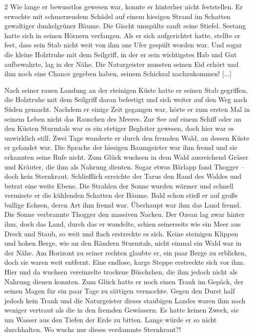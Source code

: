 \documentclass[10pt, a4paper, oneside]{book}
\begin{document}
\begin{multicols}{2}
Wie lange er bewusstlos gewesen war, konnte er hinterher nicht feststellen. Er erwachte mit schmerzendem Schädel auf einem kiesigen Strand im Schatten gewaltiger dunkelgrüner Bäume. Die Gischt umspülte sanft seine Stiefel. Seetang hatte sich in seinen Hörnern verfangen. Als er sich aufgerichtet hatte, stellte er fest, dass sein Stab nicht weit von ihm ans Ufer gespült worden war. Und sogar die kleine Holztruhe mit dem Seilgriff, in der er sein wichtigstes Hab und Gut aufbewahrte, lag in der Nähe. Die Naturgeister mussten seinen Eid erhört und ihm noch eine Chance gegeben haben, seinem Schicksal nachzukommen! [...]

Nach seiner rauen Landung an der steinigen Küste hatte er seinen Stab gegriffen, die Holztruhe mit dem Seilgriff daran befestigt und sich weiter auf den Weg nach Süden gemacht. Nachdem er einige Zeit gegangen war, hörte er zum ersten Mal in seinem Leben nicht das Rauschen des Meeres. Zur See auf einem Schiff oder an den Küsten Sturmtals war es ein stetiger Begleiter gewesen, doch hier war es unwirklich still. Zwei Tage wanderte er durch den fremden Wald, an dessen Küste er gelandet war. Die Sprache der hiesigen Baumgeister war ihm fremd und sie erkannten seine Rufe nicht. Zum Glück wuchsen in dem Wald ausreichend Gräser und Kräuter, die ihm als Nahrung dienten. Sogar etwas Bärlapp fand Thogger – doch kein Sternkraut. Schließlich erreichte der Tarus den Rand des Waldes und betrat eine weite Ebene. Die Strahlen der Sonne wurden wärmer und schnell vermisste er die kühlenden Schatten der Bäume. Bald schon stieß er auf große bullige Echsen, deren Art ihm fremd war. Überhaupt war ihm das Land fremd. Die Sonne verbrannte Thogger den massiven Nacken. Der Ozean lag zwar hinter ihm, doch das Land, durch das er wandelte, schien seinerseits wie ein Meer aus Dreck und Staub, so weit und flach erstreckte es sich. Keine steinigen Klippen und hohen Berge, wie an den Rändern Sturmtals, nicht einmal ein Wald war in der Nähe. Am Horizont zu seiner rechten glaubte er, ein paar Berge zu erblicken, doch sie waren weit entfernt. Eine endlose, karge Steppe erstreckte sich vor ihm. Hier und da wuchsen vereinzelte trockene Büschchen, die ihm jedoch nicht als Nahrung dienen konnten. Zum Glück hatte er noch einen Trank im Gepäck, der seinen Magen für ein paar Tage zu sättigen vermochte. Gegen den Durst half jedoch kein Trank und die Naturgeister dieses staubigen Landes waren ihm noch weniger vertraut als die in den fremden Gewässern. Es hatte keinen Zweck, sie um Wasser aus den Tiefen der Erde zu bitten. Lange würde er so nicht durchhalten. Wo wuchs nur dieses verdammte Sternkraut?!\bigskip


\end{multicols}
\end{document}
